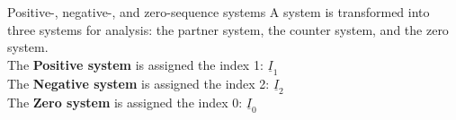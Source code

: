 \begin{frame}

    \begin{Key point}{Positive-, negative-, and zero-sequence systems}
        A system is transformed into three systems for analysis: the partner system, the counter system, and the zero system. \\
        The {\bf Positive system} is assigned the index 1: \qquad  $\underline{I}_1$ \\
        The {\bf Negative system} is assigned the index 2: \qquad $\underline{I}_2$ \\
        The {\bf Zero system} is assigned the index 0: \qquad $\underline{I}_0$ 
    \end{Key point}
\end{frame}



